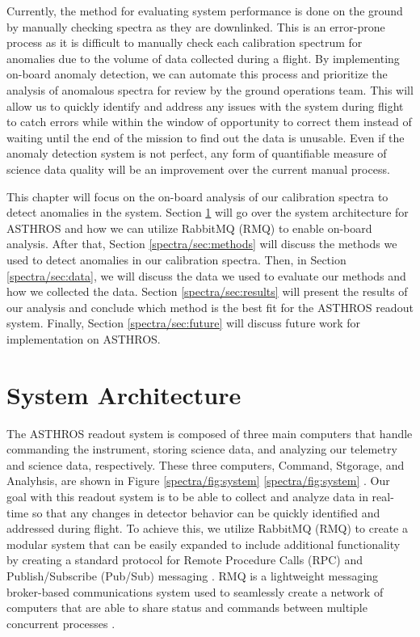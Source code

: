 Currently, the method for evaluating system performance is done on the ground by manually checking spectra as they are downlinked.
This is an error-prone process as it is difficult to manually check each calibration spectrum for anomalies due to the volume of data collected during a flight.
By implementing on-board anomaly detection, we can automate this process and prioritize the analysis of anomalous spectra for review by the ground operations team.
This will allow us to quickly identify and address any issues with the system during flight to catch errors while within the window of opportunity to correct them instead of waiting until the end of the mission to find out the data is unusable.
Even if the anomaly detection system is not perfect, any form of quantifiable measure of science data quality will be an improvement over the current manual process.

This chapter will focus on the on-board analysis of our calibration spectra to detect anomalies in the system.
Section \ref{spectra/sec:system} will go over the system architecture for ASTHROS and how we can utilize RabbitMQ (RMQ) to enable on-board analysis.
After that, Section \ref{spectra/sec:methods} will discuss the methods we used to detect anomalies in our calibration spectra.
Then, in Section \ref{spectra/sec:data}, we will discuss the data we used to evaluate our methods and how we collected the data.
Section \ref{spectra/sec:results} will present the results of our analysis and conclude which method is the best fit for the ASTHROS readout system.
Finally, Section \ref{spectra/sec:future} will discuss future work for implementation on ASTHROS. 

\section{System Architecture}
\label{spectra/sec:system}
The ASTHROS readout system is composed of three main computers that handle commanding the instrument, storing science data, and analyzing our telemetry and science data, respectively. 
These three computers, Command, Stgorage, and Analyhsis, are shown in Figure \ref{spectra/fig:system} \ref{spectra/fig:system} \parencite{horton2024readout}.
Our goal with this readout system is to be able to collect and analyze data in real-time so that any changes in detector behavior can be quickly identified and addressed during flight. 
To achieve this, we utilize RabbitMQ (RMQ) to create a modular system that can be easily expanded to include additional functionality by creating a standard protocol for Remote Procedure Calls (RPC) and Publish/Subscribe (Pub/Sub) messaging \parencite{dobbelaere2017kafkaversusrabbitmq}.
RMQ is a lightweight messaging broker-based communications system used to seamlessly create a network of computers that are able to share status and commands between multiple concurrent processes \parencite{thompson2024architecture}.

